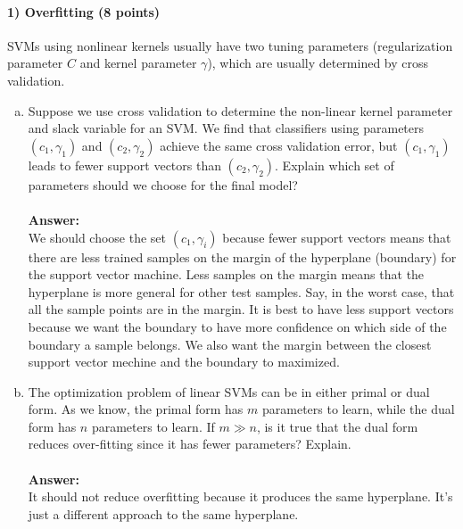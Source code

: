 \documentclass[11pt]{article}
\begin{document}
\paragraph{1) Overfitting (8 points)}
SVMs using nonlinear kernels usually have two tuning parameters (regularization parameter $C$ and kernel parameter $\gamma$), which are usually determined by cross validation. 
\begin{enumerate}[(a)]
\item Suppose we use cross validation to determine the non-linear kernel parameter and slack variable for an SVM. We find that classifiers using parameters $(c_1,\gamma_1)$ and $(c_2,\gamma_2)$ achieve the same cross validation error, but $(c_1,\gamma_1)$ leads to fewer support vectors than $(c_2,\gamma_2)$. Explain which set of parameters should we choose for the final model?
\\ \\
{\bf Answer: } \\
We should choose the set $(c_1, \gamma_i)$ because fewer support vectors means that there are less trained samples on the margin of the hyperplane (boundary) for the support vector machine. Less samples on the margin means that the hyperplane is more general for other test samples. Say, in the worst case, that all the sample points are in the margin. It is best to have less support vectors because we want the boundary to have more confidence on which side of the boundary a sample belongs. We also want the margin between the closest support vector mechine and the boundary to maximized.


\item The optimization problem of linear SVMs can be in either primal or dual form. As we know, the primal form has $m$ parameters to learn, while the dual form has $n$ parameters to learn. If $m \gg n$, is it true that the dual form reduces over-fitting since it has fewer parameters? Explain.
\\ \\
{\bf Answer: } \\
It should not reduce overfitting because it produces the same hyperplane. It's just a different approach to the same hyperplane. 
\end{enumerate}
\end{document}
